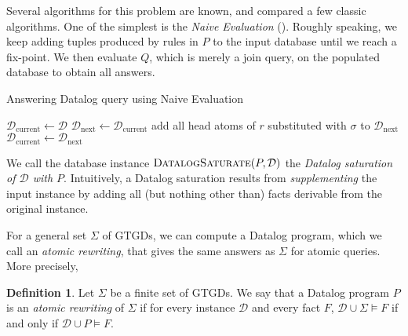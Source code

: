 \documentclass[12pt]{report}
\theoremstyle{plain}
\theoremstyle{definition}
\newtheorem{definition}[theorem]{Definition}
\begin{document}
Several algorithms for this problem are known, and \cite{bancilhon_ramakrishnan_1986} compared a few classic algorithms. One of the simplest is the \emph{Naive Evaluation} (). Roughly speaking, we keep adding tuples produced by rules in $P$ to the input database until we reach a fix-point. We then evaluate $Q$, which is merely a join query, on the populated database to obtain all answers.

\begin{algorithm}
\caption{Answering Datalog query using Naive Evaluation}
\label{algorithm:naive-evaluation-algorithm}
\begin{algorithmic}[1]
  \State $\mathcal{D}_\mathrm{current} \gets \mathcal{D}$
    \State $\mathcal{D}_\mathrm{next} \gets \mathcal{D}_\mathrm{current}$
        \State add all head atoms of $r$ substituted with $\sigma$ to $\mathcal{D}_\mathrm{next}$
      \EndFor
    \EndFor
    \State
      \State $\mathcal{D}_\mathrm{current} \gets \mathcal{D}_\mathrm{next}$
    \Else
      \State {}
    \EndIf
  \EndWhile
\EndProcedure
\State
{}
  \State {}
\EndProcedure
\end{algorithmic}
\end{algorithm}

We call the database instance $\textsc{DatalogSaturate}(P, \mathcal{D})$ the \emph{Datalog saturation of $\mathcal{D}$ with $P$}. Intuitively, a Datalog saturation results from \emph{supplementing} the input instance by adding all (but nothing other than) facts derivable from the original instance.

For a general set $\Sigma$ of GTGDs, we can compute a Datalog program, which we call an \emph{atomic rewriting}, that gives the same answers as $\Sigma$ for atomic queries. More precisely,

\begin{definition}
  Let $\Sigma$ be a finite set of GTGDs. We say that a Datalog program $P$ is an \emph{atomic rewriting} of $\Sigma$ if for every instance $\mathcal{D}$ and every fact $F$, $\mathcal{D} \cup \Sigma \models F$ if and only if $\mathcal{D} \cup P \models F$.
\end{definition}
\end{document}
